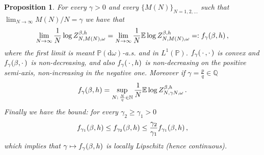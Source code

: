 \documentclass[11pt]{article}
\newtheorem{prop}[theo]{Proposition}
\theoremstyle{definition}
\numberwithin{equation}{section}
\numberwithin{figure}{section}
\numberwithin{table}{section}
\newcommand{\gb}{\beta}
\newcommand{\go}{\omega}
\newcommand{\dd}{\mathrm{d}}
\newcommand{\tf}{\textsc{f}} %
\newcommand{\bbE}{\ensuremath{\mathbb{E}}}
\newcommand{\bbN}{\ensuremath{\mathbb{N}}}
\newcommand{\bbP}{\ensuremath{\mathbb{P}}}
\newcommand{\bbQ}{\ensuremath{\mathbb{Q}}}
\begin{document}
\begin{prop}\label{th:existence+}
For every $\gamma>0$ and every $\{M(N)\}_{N=1,2, \ldots}$ such that $\lim_{N \to \infty} M(N)/N=\gamma$ we have that
\begin{equation}\label{eq:existence+.1}
\lim_{N \to \infty} \frac{1}{N} \log Z_{N,M(N), \go}^{\gb,h}= \lim_{N \to \infty}
\frac{1}{N} \bbE \log Z_{N,M(N), \go}^{\gb,h} =: \tf_\gamma(\gb, h)\,,
\end{equation}
where the first limit is meant $\bbP(\dd \go)$-a.s. and in $L^1 (\bbP)$. $\tf_\gamma ({\,\cdot\,,\cdot\,})$ is convex and $\tf_\gamma ({\gb,\cdot\,})$ is non-decreasing, and also $\tf_\gamma ({\,\cdot\,,h})$ is non-decreasing on the positive semi-axis, non-increasing in the negative one. Moreover if $\gamma=\frac{p}{q}\in \bbQ$
\begin{equation}\label{eq:existence+.2}
\tf_\gamma (\gb, h) = \sup_{N:\,\frac{N}{q}\in \bbN} \frac{1}{N} \bbE \log Z_{N, \gamma N, \go}^{\gb,h}\,.
\end{equation}
Finally we have the bound: for every $\gamma_2\ge \gamma_1 >0$
\begin{equation}\label{eq:existence+.3}
\tf_{\gamma_1}(\gb, h) \le \tf_{\gamma_2}(\gb, h)\le \frac{\gamma_2}{\gamma_1} \tf_{\gamma_1}(\gb, h)\,,
\end{equation}
which implies that $\gamma \mapsto \tf_{\gamma}(\gb, h)$ is locally Lipschitz (hence continuous).
\end{prop}
\end{document}
